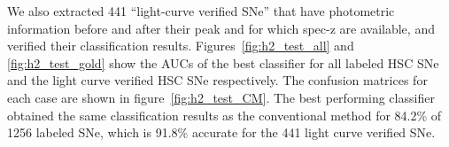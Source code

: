\documentclass[useamsfonts]{pasj01}
\begin{document}
We also extracted 441 ``light-curve verified SNe'' that have photometric information before and after their peak and for which spec-z are available, and verified their classification results.
Figures\ \ref{fig:h2_test_all} and \ref{fig:h2_test_gold} show the AUCs of the best classifier for all labeled HSC SNe and the light curve verified HSC SNe respectively.
The confusion matrices for each case are shown in figure\ \ref{fig:h2_test_CM}.
The best performing classifier obtained the same classification results as the conventional method for 84.2\% of 1256 labeled SNe, which is 91.8\% accurate for the 441 light curve verified SNe.
%
%
%
%
\end{document}
